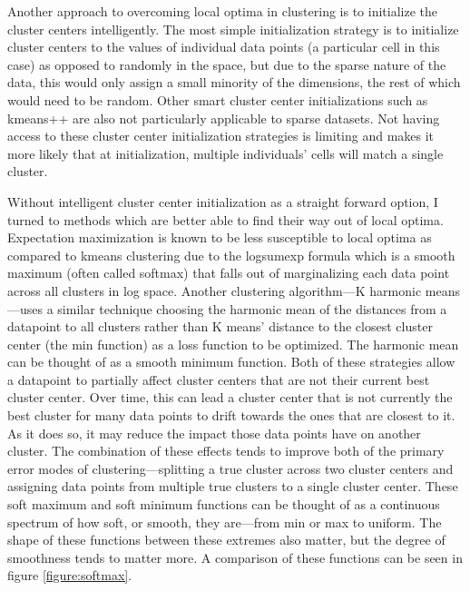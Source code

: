 \par{Another approach to overcoming local optima in clustering is to initialize the cluster centers intelligently. The most simple initialization strategy is to initialize cluster centers to the values of individual data points (a particular cell in this case) as opposed to randomly in the space, but due to the sparse nature of the data, this would only assign a small minority of the dimensions, the rest of which would need to be random. Other smart cluster center initializations such as kmeans++ are also not particularly applicable to sparse datasets\cite{kmeanspp}. Not having access to these cluster center initialization strategies is limiting and makes it more likely that at initialization, multiple individuals' cells will match a single cluster.}
\par{ Without intelligent cluster center initialization as a straight forward option, I turned to methods which are better able to find their way out of local optima. Expectation maximization is known to be less susceptible to local optima as compared to kmeans clustering due to the logsumexp formula which is a smooth maximum (often called softmax) that falls out of marginalizing each data point across all clusters in log space\cite{KHM}. Another clustering algorithm---K harmonic means---uses a similar technique choosing the harmonic mean of the distances from a datapoint to all clusters rather than K means' distance to the closest cluster center (the min function) as a loss function to be optimized. The harmonic mean can be thought of as a smooth minimum function. Both of these strategies allow a datapoint to partially affect cluster centers that are not their current best cluster center. Over time, this can lead a cluster center that is not currently the best cluster for many data points to drift towards the ones that are closest to it. As it does so, it may reduce the impact those data points have on another cluster. The combination of these effects tends to improve both of the primary error modes of clustering---splitting a true cluster across two cluster centers and assigning data points from multiple true clusters to a single cluster center. These soft maximum and soft minimum functions can be thought of as a continuous spectrum of how soft, or smooth, they are---from min or max to uniform. The shape of these functions between these extremes also matter, but the degree of smoothness tends to matter more. A comparison of these functions can be seen in figure \ref{figure:softmax}. 
}


